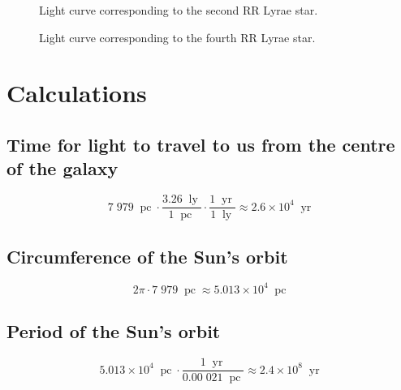 \documentclass[11pt]{article}
\DeclareMathOperator{\ly}{ly}
\DeclareMathOperator{\pc}{pc}
\DeclareMathOperator{\yr}{yr}
\begin{document}
\begin{figure}[H]
\caption{Light curve corresponding to the second RR Lyrae star.}
\begin{center}
\end{center}
\label{fig:light-curve-1}
\end{figure}

\begin{figure}[H]
\caption{Light curve corresponding to the fourth RR Lyrae star.}
\begin{center}
\end{center}
\label{fig:light-curve-3}
\end{figure}


\section{Calculations}
\subsection*{Time for light to travel to us from the centre of the galaxy}
\[7\;979\;\pc \cdot \frac{3.26\;\ly}{1\;\pc} \cdot \frac{1\;\yr}{1\;\ly} \approx 2.6 \times 10^{4}\;\yr\]


\subsection*{Circumference of the Sun's orbit}
\[2 \pi \cdot 7\;979\;\pc \approx 5.013 \times 10^{4}\;\pc\]


\subsection*{Period of the Sun's orbit}
\[5.013 \times 10^{4}\;\pc \cdot \frac{1\;\yr}{0.00\;021\;\pc} \approx 2.4 \times 10^{8}\;\yr\]
\end{document}
